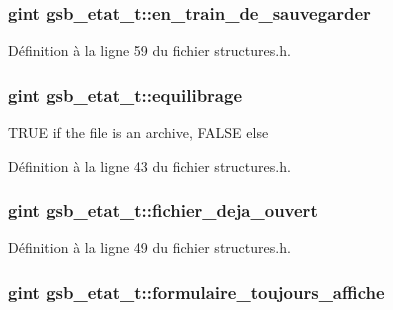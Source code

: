 \subsubsection[{en\_\-train\_\-de\_\-sauvegarder}]{\setlength{\rightskip}{0pt plus 5cm}gint {\bf gsb\_\-etat\_\-t::en\_\-train\_\-de\_\-sauvegarder}}\label{structgsb__etat__t_a1e291fdcb0a4837a3e7f5ced3dae2fce}


Définition à la ligne 59 du fichier structures.h.

\subsubsection[{equilibrage}]{\setlength{\rightskip}{0pt plus 5cm}gint {\bf gsb\_\-etat\_\-t::equilibrage}}\label{structgsb__etat__t_ae3a5af3d26105e740e989e5c6804bab2}
TRUE if the file is an archive, FALSE else 

Définition à la ligne 43 du fichier structures.h.

\subsubsection[{fichier\_\-deja\_\-ouvert}]{\setlength{\rightskip}{0pt plus 5cm}gint {\bf gsb\_\-etat\_\-t::fichier\_\-deja\_\-ouvert}}\label{structgsb__etat__t_a51b3460f67898d36bcdfce1c17cf74e1}


Définition à la ligne 49 du fichier structures.h.

\subsubsection[{formulaire\_\-toujours\_\-affiche}]{\setlength{\rightskip}{0pt plus 5cm}gint {\bf gsb\_\-etat\_\-t::formulaire\_\-toujours\_\-affiche}}\label{structgsb__etat__t_a87c3eec6adcbac2891ad3f762802fc7f}



